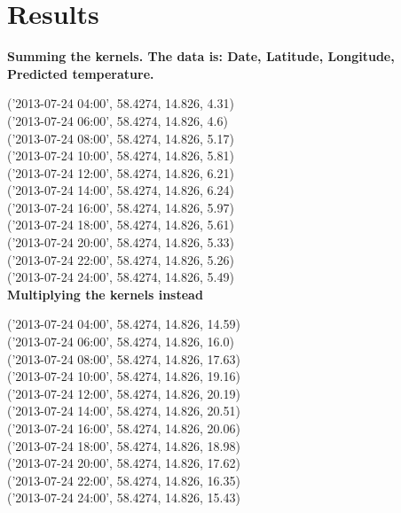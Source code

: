 \documentclass[a4paper,titlepage,12pt]{article}
\begin{document}
\section{Results}
\textbf{Summing the kernels. The data is: Date, Latitude, Longitude, Predicted temperature.}

('2013-07-24 04:00', 58.4274, 14.826, 4.31) \\
('2013-07-24 06:00', 58.4274, 14.826, 4.6) \\
('2013-07-24 08:00', 58.4274, 14.826, 5.17) \\
('2013-07-24 10:00', 58.4274, 14.826, 5.81) \\
('2013-07-24 12:00', 58.4274, 14.826, 6.21) \\
('2013-07-24 14:00', 58.4274, 14.826, 6.24) \\
('2013-07-24 16:00', 58.4274, 14.826, 5.97) \\
('2013-07-24 18:00', 58.4274, 14.826, 5.61) \\
('2013-07-24 20:00', 58.4274, 14.826, 5.33) \\
('2013-07-24 22:00', 58.4274, 14.826, 5.26) \\
('2013-07-24 24:00', 58.4274, 14.826, 5.49) \\

\textbf{Multiplying the kernels instead}

('2013-07-24 04:00', 58.4274, 14.826, 14.59) \\
('2013-07-24 06:00', 58.4274, 14.826, 16.0) \\
('2013-07-24 08:00', 58.4274, 14.826, 17.63) \\
('2013-07-24 10:00', 58.4274, 14.826, 19.16) \\
('2013-07-24 12:00', 58.4274, 14.826, 20.19) \\
('2013-07-24 14:00', 58.4274, 14.826, 20.51) \\
('2013-07-24 16:00', 58.4274, 14.826, 20.06) \\
('2013-07-24 18:00', 58.4274, 14.826, 18.98) \\
('2013-07-24 20:00', 58.4274, 14.826, 17.62) \\
('2013-07-24 22:00', 58.4274, 14.826, 16.35) \\
('2013-07-24 24:00', 58.4274, 14.826, 15.43) \\
\end{document}
